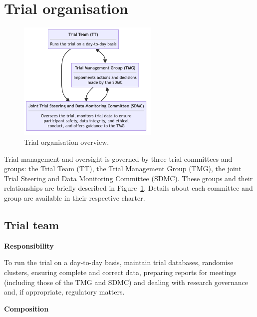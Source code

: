 \documentclass[
]{scrartcl}
\begin{document}
\hypertarget{trial-organisation}{%
\section{Trial organisation}\label{trial-organisation}}

\begin{figure}

{\centering 

\includegraphics[width=0.6\textwidth,height=\textheight]{../shared-assets/trial-organisation-overview-figure.png}

}

\caption{\label{fig-organisation-overview}Trial organisation overview.}

\end{figure}

Trial management and oversight is governed by three trial committees and
groups: the Trial Team (TT), the Trial Management Group (TMG), the joint
Trial Steering and Data Monitoring Committee (SDMC). These groups and
their relationships are briefly described in
Figure~\ref{fig-organisation-overview}. Details about each committee and
group are available in their respective charter.

\hypertarget{trial-team}{%
\subsection{Trial team}\label{trial-team}}

\textbf{Responsibility}

To run the trial on a day-to-day basis, maintain trial databases,
randomise clusters, ensuring complete and correct data, preparing
reports for meetings (including those of the TMG and SDMC) and dealing
with research governance and, if appropriate, regulatory matters.

\textbf{Composition}
\end{document}
